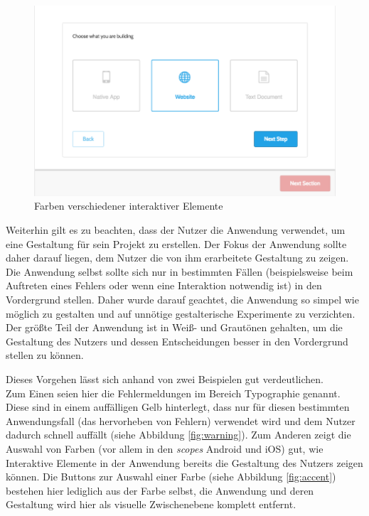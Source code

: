 \begin{figure}[h]
    \centering
    \includegraphics[width=1\textwidth]{images/25knots_entrance.png}
    \caption{Farben verschiedener interaktiver Elemente}
    \label{fig:entrance}
\end{figure}

Weiterhin gilt es zu beachten, dass der Nutzer die Anwendung verwendet, um eine Gestaltung für sein Projekt zu erstellen. Der Fokus der Anwendung sollte daher darauf liegen, dem Nutzer die von ihm erarbeitete Gestaltung zu zeigen. Die Anwendung selbst sollte sich nur in bestimmten Fällen (beispielsweise beim Auftreten eines Fehlers oder wenn eine Interaktion notwendig ist) in den Vordergrund stellen. Daher wurde darauf geachtet, die Anwendung so simpel wie möglich zu gestalten und auf unnötige gestalterische Experimente zu verzichten. Der größte Teil der Anwendung ist in Weiß- und Grautönen gehalten, um die Gestaltung des Nutzers und dessen Entscheidungen besser in den Vordergrund stellen zu können.

Dieses Vorgehen lässt sich anhand von zwei Beispielen gut verdeutlichen.\\
Zum Einen seien hier die Fehlermeldungen im Bereich Typographie genannt. Diese sind in einem auffälligen Gelb hinterlegt, dass nur für diesen bestimmten Anwendungsfall (das hervorheben von Fehlern) verwendet wird und dem Nutzer dadurch schnell auffällt (siehe Abbildung \ref{fig:warning}).
Zum Anderen zeigt die Auswahl von Farben (vor allem in den \textit{scopes} Android und iOS) gut, wie Interaktive Elemente in der Anwendung bereits die Gestaltung des Nutzers zeigen können. Die Buttons zur Auswahl einer Farbe (siehe Abbildung \ref{fig:accent}) bestehen hier lediglich aus der Farbe selbst, die Anwendung und deren Gestaltung wird hier als visuelle Zwischenebene komplett entfernt.

